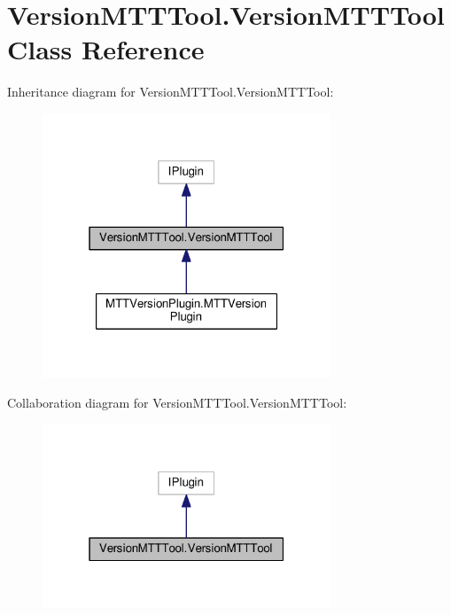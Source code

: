 \hypertarget{classVersionMTTTool_1_1VersionMTTTool}{\section{Version\-M\-T\-T\-Tool.\-Version\-M\-T\-T\-Tool Class Reference}
\label{classVersionMTTTool_1_1VersionMTTTool}
}


Inheritance diagram for Version\-M\-T\-T\-Tool.\-Version\-M\-T\-T\-Tool\-:
\nopagebreak
\begin{figure}[H]
\begin{center}
\leavevmode
\includegraphics[width=244pt]{classVersionMTTTool_1_1VersionMTTTool__inherit__graph}
\end{center}
\end{figure}


Collaboration diagram for Version\-M\-T\-T\-Tool.\-Version\-M\-T\-T\-Tool\-:
\nopagebreak
\begin{figure}[H]
\begin{center}
\leavevmode
\includegraphics[width=244pt]{classVersionMTTTool_1_1VersionMTTTool__coll__graph}
\end{center}
\end{figure}
